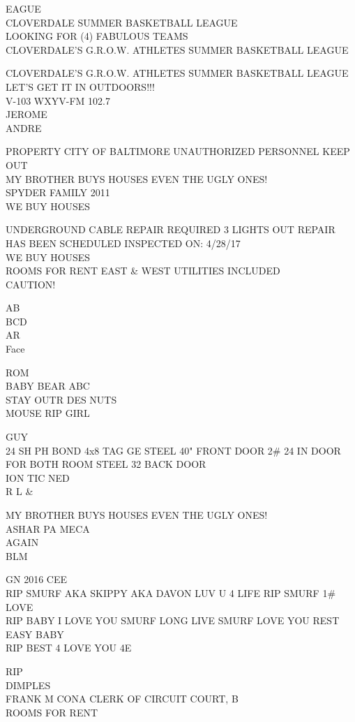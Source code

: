 \documentclass[10pt,letterpaper]{article}
\begin{document}
EAGUE\\
CLOVERDALE SUMMER BASKETBALL LEAGUE\\
LOOKING FOR (4) FABULOUS TEAMS\\
CLOVERDALE'S G.R.O.W. ATHLETES SUMMER BASKETBALL LEAGUE

CLOVERDALE'S G.R.O.W. ATHLETES SUMMER BASKETBALL LEAGUE LET'S GET IT IN OUTDOORS!!!\\
V{-}103 WXYV{-}FM 102.7\\
JEROME\\
ANDRE

PROPERTY CITY OF BALTIMORE UNAUTHORIZED PERSONNEL KEEP OUT\\
MY BROTHER BUYS HOUSES EVEN THE UGLY ONES!\\
SPYDER FAMILY 2011\\
WE BUY HOUSES

UNDERGROUND CABLE REPAIR REQUIRED 3 LIGHTS OUT REPAIR HAS BEEN SCHEDULED INSPECTED ON: 4/28/17\\
WE BUY HOUSES\\
ROOMS FOR RENT EAST \& WEST UTILITIES INCLUDED\\
CAUTION!

AB\\
BCD\\
AR\\
Face

ROM\\
BABY BEAR ABC\\
STAY OUTR DES NUTS\\
MOUSE RIP GIRL

GUY\\
24 SH PH BOND 4x8 TAG GE STEEL 40" FRONT DOOR 2\# 24 IN DOOR FOR BOTH ROOM STEEL 32 BACK DOOR\\
ION TIC NED\\
R L \&

MY BROTHER BUYS HOUSES EVEN THE UGLY ONES!\\
ASHAR PA MECA\\
AGAIN\\
BLM

GN 2016 CEE\\
RIP SMURF AKA SKIPPY AKA DAVON LUV U 4 LIFE RIP SMURF 1\# LOVE\\
RIP BABY I LOVE YOU SMURF LONG LIVE SMURF LOVE YOU REST EASY BABY\\
RIP BEST 4 LOVE YOU 4E

RIP\\
DIMPLES\\
FRANK M CONA CLERK OF CIRCUIT COURT, B\\
ROOMS FOR RENT
\end{document}
